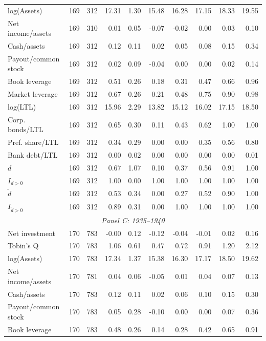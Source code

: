 \begin{threeparttable}
\begin{tabular}{lrrrrrrrrr}
log(Assets) & 169 & 312 & 17.31 & 1.30 & 15.48 & 16.28 & 17.15 & 18.33 & 19.55 \\
Net income/assets & 169 & 310 & 0.01 & 0.05 & -0.07 & -0.02 & 0.00 & 0.03 & 0.10 \\
Cash/assets & 169 & 312 & 0.12 & 0.11 & 0.02 & 0.05 & 0.08 & 0.15 & 0.34 \\
Payout/common stock & 169 & 312 & 0.02 & 0.09 & -0.04 & 0.00 & 0.00 & 0.02 & 0.14 \\
Book leverage & 169 & 312 & 0.51 & 0.26 & 0.18 & 0.31 & 0.47 & 0.66 & 0.96 \\
Market leverage & 169 & 312 & 0.67 & 0.26 & 0.21 & 0.48 & 0.75 & 0.90 & 0.98 \\
log(LTL) & 169 & 312 & 15.96 & 2.29 & 13.82 & 15.12 & 16.02 & 17.15 & 18.50 \\
Corp. bonds/LTL & 169 & 312 & 0.65 & 0.30 & 0.11 & 0.43 & 0.62 & 1.00 & 1.00 \\
Pref. share/LTL & 169 & 312 & 0.34 & 0.29 & 0.00 & 0.00 & 0.35 & 0.56 & 0.80 \\
Bank debt/LTL & 169 & 312 & 0.00 & 0.02 & 0.00 & 0.00 & 0.00 & 0.00 & 0.01 \\
\ensuremath{d} & 169 & 312 & 0.67 & 1.07 & 0.10 & 0.37 & 0.56 & 0.91 & 1.00 \\
\ensuremath{I_{d>0}} & 169 & 312 & 1.00 & 0.00 & 1.00 & 1.00 & 1.00 & 1.00 & 1.00 \\
\ensuremath{\tilde{d}} & 169 & 312 & 0.53 & 0.34 & 0.00 & 0.27 & 0.52 & 0.90 & 1.00 \\
\ensuremath{I_{\tilde{d}>0}} & 169 & 312 & 0.89 & 0.31 & 0.00 & 1.00 & 1.00 & 1.00 & 1.00 \\
\midrule
\multicolumn{10}{c}{\textit{Panel C: 1935--1940}} \\
\midrule
Net investment & 170 & 783 & -0.00 & 0.12 & -0.12 & -0.04 & -0.01 & 0.02 & 0.16 \\
Tobin's Q & 170 & 783 & 1.06 & 0.61 & 0.47 & 0.72 & 0.91 & 1.20 & 2.12 \\
log(Assets) & 170 & 783 & 17.34 & 1.37 & 15.38 & 16.30 & 17.17 & 18.50 & 19.62 \\
Net income/assets & 170 & 781 & 0.04 & 0.06 & -0.05 & 0.01 & 0.04 & 0.07 & 0.13 \\
Cash/assets & 170 & 783 & 0.12 & 0.11 & 0.02 & 0.06 & 0.10 & 0.15 & 0.30 \\
Payout/common stock & 170 & 783 & 0.05 & 0.28 & -0.10 & 0.00 & 0.00 & 0.07 & 0.36 \\
Book leverage & 170 & 783 & 0.48 & 0.26 & 0.14 & 0.28 & 0.42 & 0.65 & 0.91 \\

\end{tabular}
\end{threeparttable}
